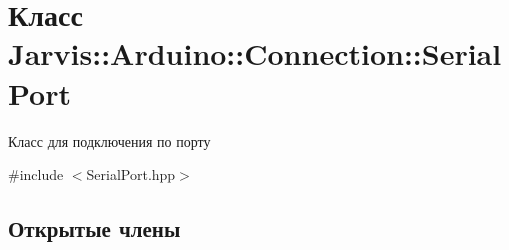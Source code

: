 \hypertarget{classJarvis_1_1Arduino_1_1Connection_1_1SerialPort}{}\section{Класс Jarvis\+:\+:Arduino\+:\+:Connection\+:\+:Serial\+Port}
\label{classJarvis_1_1Arduino_1_1Connection_1_1SerialPort}


Класс для подключения по порту  




{\ttfamily \#include $<$Serial\+Port.\+hpp$>$}

\subsection*{Открытые члены}
